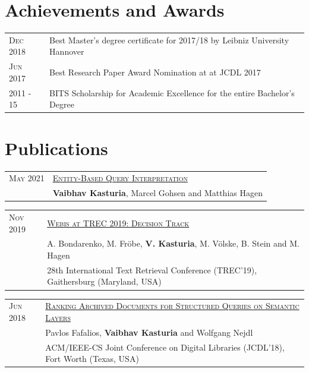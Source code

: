 \documentclass[a4paper,10pt]{article} %
\begin{document}

\section{Achievements and Awards}

\begin{tabular}{ll}
\textsc{Dec} 2018 & Best Master's degree certificate for 2017/18 by Leibniz University Hannover\\
\textsc{Jun} 2017 & Best Research Paper Award Nomination at at JCDL 2017\\
\textsc{2011 - 15} & BITS Scholarship for Academic Excellence for the entire Bachelor’s Degree\\
\end{tabular}


\section{Publications}

\begin{tabular}{ll}
\textsc{May 2021} & \href{https://arxiv.org/pdf/2105.08581.pdf}{\textsc{Entity-Based Query Interpretation}}\\
& \textbf{Vaibhav Kasturia}, Marcel Gohsen and Matthias Hagen \\
\end{tabular}

\begin{tabular}{ll}
\textsc{Nov 2019} & \href{https://webis.de/downloads/publications/papers/bondarenko_2019.pdf}{\textsc{Webis at TREC 2019: Decision Track}}\\
& A. Bondarenko, M. Fröbe, \textbf{V. Kasturia}, M. Völske, B. Stein and M. Hagen \\
& 28th International Text Retrieval Conference (TREC'19), Gaithersburg (Maryland, USA)\\
\end{tabular}

\begin{tabular}{ll}
\textsc{Jun 2018} & \href{https://dl.acm.org/doi/10.1145/3197026.3197049}{\textsc{Ranking Archived Documents for Structured Queries on Semantic Layers}}\\
& Pavlos Fafalios, \textbf{Vaibhav Kasturia} and Wolfgang Nejdl\\
& ACM/IEEE-CS Joint Conference on Digital Libraries (JCDL’18), Fort Worth (Texas, USA)\\
\end{tabular}
\end{document}
